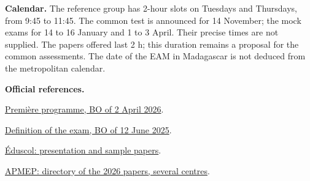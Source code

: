 \textbf{Calendar.} The reference group has 2-hour slots on Tuesdays and Thursdays, from 9:45 to 11:45. The common test is announced for 14 November; the mock exams for 14 to 16 January and 1 to 3 April. Their precise times are not supplied. The papers offered last 2 h; this duration remains a proposal for the common assessments. The date of the EAM in Madagascar is not deduced from the metropolitan calendar.

\textbf{Official references.}\par
\href{https://www.education.gouv.fr/bo/2026/Hebdo14/MENE2602917A}{Première programme, BO of 2 April 2026}.\par
\href{https://www.education.gouv.fr/bo/2025/Hebdo24/MENE2515469N}{Definition of the exam, BO of 12 June 2025}.\par
\href{https://eduscol.education.gouv.fr/5688/epreuve-anticipee-de-mathematiques-aux-baccalaureats-general-et-technologique}{Éduscol: presentation and sample papers}.\par
\href{https://www.apmep.fr/Epreuve-anticipee-2026}{APMEP: directory of the 2026 papers, several centres}.
\tableofcontents
\clearpage
